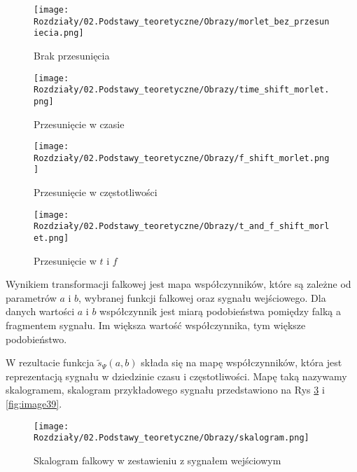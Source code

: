 \begin{figure}[H]
    \centering
    \begin{minipage}[t]{0.47\linewidth}
        \texttt{[image: Rozdziały/02.Podstawy\_teoretyczne/Obrazy/morlet\_bez\_przesuniecia.png]}
        \caption{Brak przesunięcia}
        \label{fig:image34}
    \end{minipage}
    \centering
    \begin{minipage}[t]{0.47\linewidth}
        \texttt{[image: Rozdziały/02.Podstawy\_teoretyczne/Obrazy/time\_shift\_morlet.png]}
        \caption{Przesunięcie w czasie}
        \label{fig:image35}
    \end{minipage}
\end{figure}

\begin{figure}[H]
    \centering
    \begin{minipage}[t]{0.46\linewidth}
        \texttt{[image: Rozdziały/02.Podstawy\_teoretyczne/Obrazy/f\_shift\_morlet.png]}
        \caption{Przesunięcie w częstotliwości}
        \label{fig:image36}
    \end{minipage}
    \centering
    \begin{minipage}[t]{0.46\linewidth}
        \texttt{[image: Rozdziały/02.Podstawy\_teoretyczne/Obrazy/t\_and\_f\_shift\_morlet.png]}
        \caption{Przesunięcie w $t$ i $f$}
        \label{fig:image37}
    \end{minipage}
\end{figure}


Wynikiem transformacji falkowej jest mapa współczynników, które są zależne od parametrów $a$ i $b$, wybranej funkcji falkowej oraz sygnału wejściowego. Dla danych wartości $a$ i $b$ współczynnik jest miarą podobieństwa pomiędzy falką a fragmentem sygnału. Im większa wartość współczynnika, tym większe podobieństwo.


W rezultacie funkcja $ \tilde{s}_{\Psi}\left(a,b\right)$ składa się na mapę współczynników, która jest reprezentacją sygnału w dziedzinie czasu i częstotliwości. Mapę taką nazywamy skalogramem, skalogram przykładowego sygnału przedstawiono na Rys \ref{fig:image38} i \ref{fig:image39}.

\begin{figure}[ht]
    \centering
    \begin{minipage}[t]{0.9\linewidth}
        \texttt{[image: Rozdziały/02.Podstawy\_teoretyczne/Obrazy/skalogram.png]}
        \caption{Skalogram falkowy w zestawieniu z sygnałem wejściowym}
        \label{fig:image38}
    \end{minipage}
\end{figure}


